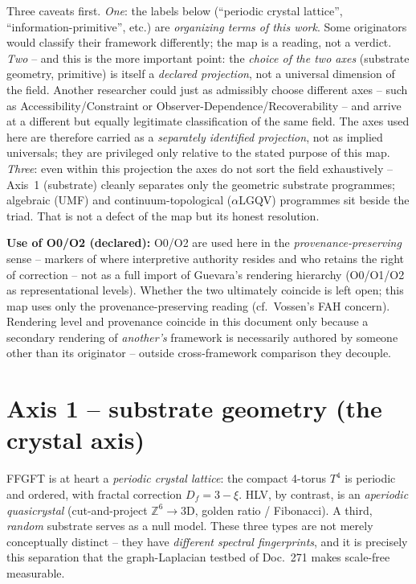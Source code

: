 Three caveats first. \emph{One}: the labels below (\enquote{periodic crystal lattice},
\enquote{information-primitive}, etc.) are \emph{organizing terms of this work}. Some originators
would classify their framework differently; the map is a reading, not a verdict. \emph{Two} --
and this is the more important point: the \emph{choice of the two axes} (substrate geometry,
primitive) is itself a \emph{declared projection}, not a universal dimension of the field.
Another researcher could just as admissibly choose different axes -- such as Accessibility/Constraint
or Observer-Dependence/Recoverability -- and arrive at a different but equally legitimate
classification of the same field. The axes used here are therefore carried as a \emph{separately
identified projection}, not as implied universals; they are privileged only relative to the stated
purpose of this map. \emph{Three}: even within this projection the axes do not sort the field
exhaustively -- Axis~1 (substrate) cleanly separates only the geometric substrate programmes;
algebraic (UMF) and continuum-topological ($\alpha$LGQV) programmes sit beside the triad. That is
not a defect of the map but its honest resolution.

\medskip\noindent\textbf{Use of O0/O2 (declared):} O0/O2 are used here in the
\emph{provenance-preserving} sense -- markers of where interpretive authority resides and who
retains the right of correction -- not as a full import of Guevara's rendering hierarchy
(O0/O1/O2 as representational levels). Whether the two ultimately coincide is left open; this map
uses only the provenance-preserving reading (cf.\ Vossen's FAH concern). Rendering level and
provenance coincide in this document only because a secondary rendering of \emph{another's}
framework is necessarily authored by someone other than its originator -- outside cross-framework
comparison they decouple.

\section{Axis 1 -- substrate geometry (the crystal axis)}

FFGFT is at heart a \emph{periodic crystal lattice}: the compact 4-torus $T^4$ is periodic and
ordered, with fractal correction $D_f=3-\xi$. HLV, by contrast, is an \emph{aperiodic quasicrystal}
(cut-and-project $\mathbb{Z}^6\!\to\!3$D, golden ratio / Fibonacci). A third, \emph{random}
substrate serves as a null model. These three types are not merely conceptually distinct -- they
have \emph{different spectral fingerprints}, and it is precisely this separation that the
graph-Laplacian testbed of Doc.~271 makes scale-free measurable.

